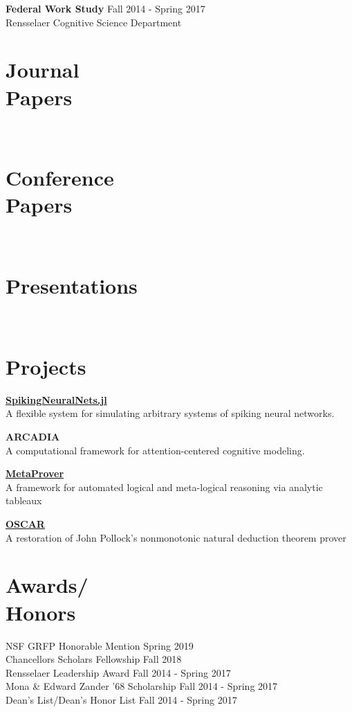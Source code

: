 \documentclass[margin]{res}
\begin{document}
\begin{resume}
  \textbf{Federal Work Study} \hfill Fall 2014 - Spring 2017 \\
  Rensselaer Cognitive Science Department \\


  
  \section{Journal\\Papers}
   \\
  
  \section{Conference\\Papers}
   \\
  
  \section{Presentations}
   \\
  
  
  \section{Projects}
  \href{https://github.com/pearsonlab/SpikingNeuralNets.jl}{\textbf{SpikingNeuralNets.jl}} \\
  A flexible system for simulating arbitrary systems of spiking neural networks.

  \textbf{ARCADIA} \\
  A computational framework for attention-centered cognitive modeling.
  
  \href{https://github.com/kevingoneill/MetaProver}{\textbf{MetaProver}}
  \\ A framework for automated logical and meta-logical reasoning via
  analytic tableaux

  \href{http://rair.cogsci.rpi.edu/projects/automated-reasoners/oscar/}{\textbf{OSCAR}} \\
  A restoration of John Pollock's nonmonotonic natural deduction theorem prover \\
  
  \section{Awards/\\Honors}
  NSF GRFP Honorable Mention \hfill Spring 2019 \\
  Chancellors Scholars Fellowship \hfill Fall 2018 \\
  Rensselaer Leadership Award \hfill Fall 2014 - Spring 2017 \\
  Mona \& Edward Zander '68 Scholarship \hfill Fall 2014 - Spring 2017 \\
  Dean's List/Dean's Honor List \hfill Fall 2014 - Spring 2017 \\


\end{resume}
\end{document}
